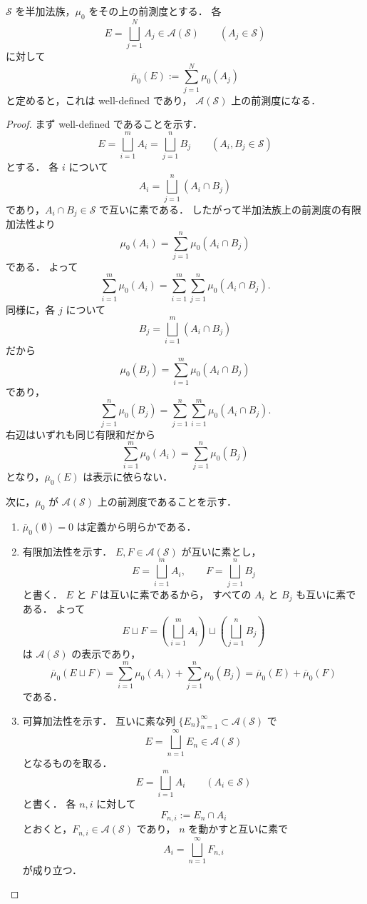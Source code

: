 \begin{proposition}[半加法族上の前測度の延長]
$\mathcal S$ を半加法族，$\mu_0$ をその上の前測度とする．
各
\[
E=\bigsqcup_{j=1}^N A_j \in \mathcal A(\mathcal S)
\qquad
(A_j \in \mathcal S)
\]
に対して
\[
\overline{\mu}_0(E):=\sum_{j=1}^N \mu_0(A_j)
\]
と定めると，これは well-defined であり，
$\mathcal A(\mathcal S)$ 上の前測度になる．
\end{proposition}
\begin{proof}
まず well-defined であることを示す．
\[
E=\bigsqcup_{i=1}^m A_i=\bigsqcup_{j=1}^n B_j
\qquad
(A_i,B_j \in \mathcal S)
\]
とする．
各 $i$ について
\[
A_i=\bigsqcup_{j=1}^n (A_i \cap B_j)
\]
であり，$A_i \cap B_j \in \mathcal S$ で互いに素である．
したがって半加法族上の前測度の有限加法性より
\[
\mu_0(A_i)=\sum_{j=1}^n \mu_0(A_i \cap B_j)
\]
である．
よって
\[
\sum_{i=1}^m \mu_0(A_i)
=
\sum_{i=1}^m \sum_{j=1}^n \mu_0(A_i \cap B_j).
\]
同様に，各 $j$ について
\[
B_j=\bigsqcup_{i=1}^m (A_i \cap B_j)
\]
だから
\[
\mu_0(B_j)=\sum_{i=1}^m \mu_0(A_i \cap B_j)
\]
であり，
\[
\sum_{j=1}^n \mu_0(B_j)
=
\sum_{j=1}^n \sum_{i=1}^m \mu_0(A_i \cap B_j).
\]
右辺はいずれも同じ有限和だから
\[
\sum_{i=1}^m \mu_0(A_i)=\sum_{j=1}^n \mu_0(B_j)
\]
となり，$\overline{\mu}_0(E)$ は表示に依らない．

次に，$\overline{\mu}_0$ が $\mathcal A(\mathcal S)$ 上の前測度であることを示す．

\begin{enumerate}
    \item $\overline{\mu}_0(\emptyset)=0$ は定義から明らかである．

    \item 有限加法性を示す．
    $E,F \in \mathcal A(\mathcal S)$ が互いに素とし，
    \[
    E=\bigsqcup_{i=1}^m A_i,
    \qquad
    F=\bigsqcup_{j=1}^n B_j
    \]
    と書く．
    $E$ と $F$ は互いに素であるから，
    すべての $A_i$ と $B_j$ も互いに素である．
    よって
    \[
    E \sqcup F
    =
    \left(\bigsqcup_{i=1}^m A_i\right)
    \sqcup
    \left(\bigsqcup_{j=1}^n B_j\right)
    \]
    は $\mathcal A(\mathcal S)$ の表示であり，
    \[
    \overline{\mu}_0(E \sqcup F)
    =
    \sum_{i=1}^m \mu_0(A_i)+\sum_{j=1}^n \mu_0(B_j)
    =
    \overline{\mu}_0(E)+\overline{\mu}_0(F)
    \]
    である．

    \item 可算加法性を示す．
    互いに素な列 $\{E_n\}_{n=1}^{\infty}\subset \mathcal A(\mathcal S)$ で
    \[
    E=\bigsqcup_{n=1}^{\infty}E_n \in \mathcal A(\mathcal S)
    \]
    となるものを取る．
    \[
    E=\bigsqcup_{i=1}^m A_i
    \qquad
    (A_i \in \mathcal S)
    \]
    と書く．
    各 $n,i$ に対して
    \[
    F_{n,i}:=E_n \cap A_i
    \]
    とおくと，$F_{n,i}\in\mathcal A(\mathcal S)$ であり，
    $n$ を動かすと互いに素で
    \[
    A_i=\bigsqcup_{n=1}^{\infty}F_{n,i}
    \]
    が成り立つ．


\end{enumerate}
\end{proof}
